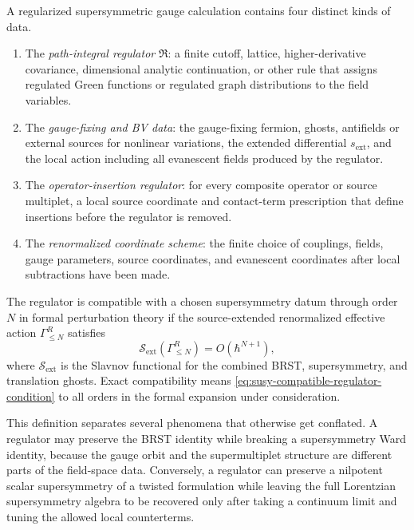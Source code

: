 \begin{definition}
\label{def:susy-separated-regularization-data}
A regularized supersymmetric gauge calculation contains four distinct kinds
of data.
\begin{enumerate}
\item The \emph{path-integral regulator} \(\mathfrak R\): a finite cutoff,
lattice, higher-derivative covariance, dimensional analytic continuation, or
other rule that assigns regulated Green functions or regulated graph
distributions to the field variables.
\item The \emph{gauge-fixing and BV data}: the gauge-fixing fermion, ghosts,
antifields or external sources for nonlinear variations, the extended
differential \(s_{\mathrm{ext}}\), and the local action including all
evanescent fields produced by the regulator.
\item The \emph{operator-insertion regulator}: for every composite operator
or source multiplet, a local source coordinate and contact-term prescription
that define insertions before the regulator is removed.
\item The \emph{renormalized coordinate scheme}: the finite choice of
couplings, fields, gauge parameters, source coordinates, and evanescent
coordinates after local subtractions have been made.
\end{enumerate}
The regulator is compatible with a chosen supersymmetry datum through order
\(N\) in formal perturbation theory if the source-extended renormalized
effective action \(\Gamma^R_{\le N}\) satisfies
\begin{equation}
  \mathcal S_{\mathrm{ext}}(\Gamma^R_{\le N})
  =
  O(\hbar^{N+1}),
  \label{eq:susy-compatible-regulator-condition}
\end{equation}
where \(\mathcal S_{\mathrm{ext}}\) is the Slavnov functional for the combined
BRST, supersymmetry, and translation ghosts.  Exact compatibility means
\eqref{eq:susy-compatible-regulator-condition} to all orders in the formal
expansion under consideration.
\end{definition}

This definition separates several phenomena that otherwise get conflated.
A regulator may preserve the BRST identity while breaking a supersymmetry Ward
identity, because the gauge orbit and the supermultiplet structure are
different parts of the field-space data.  Conversely, a regulator can preserve
a nilpotent scalar supersymmetry of a twisted formulation while leaving the
full Lorentzian supersymmetry algebra to be recovered only after taking a
continuum limit and tuning the allowed local counterterms.

